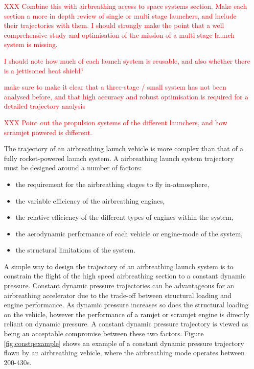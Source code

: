 \textcolor{red}{XXX Combine this with airbreathing access to space systems section. Make each section a more in depth review of single or multi stage launchers, and include their trajectories with them. I should strongly make the point that a well comprehensive study and optimisation of the mission of a multi stage launch system is missing.}

\textcolor{red}{I should note how much of each launch system is reusable, and also whether there is a jettisoned heat shield?}

\textcolor{red}{make sure to make it clear that a three-stage / small system has not been analysed before, and that high accuracy and robust optimisation is required for a detailed trajectory analysis}

\textcolor{red}{XXX Point out the propulsion systems of the different launchers, and how scramjet powered is different.}

The trajectory of an airbreathing launch vehicle is more complex than that of a fully rocket-powered launch system. 
A airbreathing launch system trajectory must be designed around a number of factors:
\begin{itemize}
	\item the requirement for the airbreathing stages to fly in-atmosphere,
	\item the variable efficiency of the airbreathing engines,
	\item the relative efficiency of the different types of engines within the system,
	\item the aerodynamic performance of each vehicle or engine-mode of the system,
	\item the structural limitations of the system.
\end{itemize}

A simple way to design the trajectory of an airbreathing launch system is to constrain the flight of the high speed airbreathing section to a constant dynamic pressure\cite{Olds1998,Preller2015,Punnoose2007,Kanda1996,Young2006}. 
 Constant dynamic pressure trajectories can be advantageous for an airbreathing accelerator due to the trade-off between structural loading and engine performance\cite{Olds1998}. As dynamic pressure increases so does the structural loading on the vehicle, however the performance of a ramjet or scramjet engine is directly reliant on dynamic pressure\cite{Olds1998}. A constant dynamic pressure trajectory is viewed as being an acceptable compromise between these two factors. Figure \ref{fig:constqexample} shows an example of a constant dynamic pressure trajectory flown by an airbreathing vehicle, where the airbreathing mode operates between 200-430s. 

